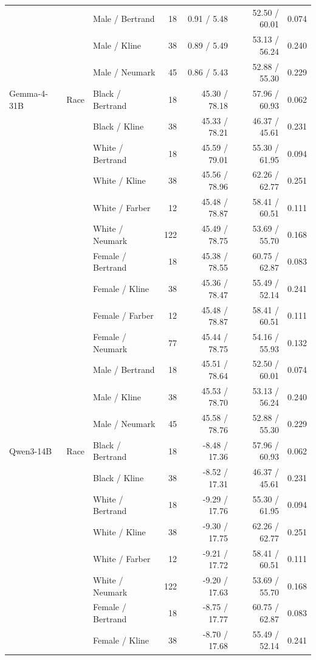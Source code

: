 \begin{longtable}{@{}lllrrrr@{}}
 &  & Male / Bertrand & 18 & 0.91 / 5.48 & 52.50 / 60.01 & 0.074 \\
 &  & Male / Kline & 38 & 0.89 / 5.49 & 53.13 / 56.24 & 0.240 \\
 &  & Male / Neumark & 45 & 0.86 / 5.43 & 52.88 / 55.30 & 0.229 \\
\addlinespace
Gemma-4-31B & Race & Black / Bertrand & 18 & 45.30 / 78.18 & 57.96 / 60.93 & 0.062 \\
 &  & Black / Kline & 38 & 45.33 / 78.21 & 46.37 / 45.61 & 0.231 \\
 &  & White / Bertrand & 18 & 45.59 / 79.01 & 55.30 / 61.95 & 0.094 \\
 &  & White / Kline & 38 & 45.56 / 78.96 & 62.26 / 62.77 & 0.251 \\
 &  & White / Farber & 12 & 45.48 / 78.87 & 58.41 / 60.51 & 0.111 \\
 &  & White / Neumark & 122 & 45.49 / 78.75 & 53.69 / 55.70 & 0.168 \\
 &  & Female / Bertrand & 18 & 45.38 / 78.55 & 60.75 / 62.87 & 0.083 \\
 &  & Female / Kline & 38 & 45.36 / 78.47 & 55.49 / 52.14 & 0.241 \\
 &  & Female / Farber & 12 & 45.48 / 78.87 & 58.41 / 60.51 & 0.111 \\
 &  & Female / Neumark & 77 & 45.44 / 78.75 & 54.16 / 55.93 & 0.132 \\
 &  & Male / Bertrand & 18 & 45.51 / 78.64 & 52.50 / 60.01 & 0.074 \\
 &  & Male / Kline & 38 & 45.53 / 78.70 & 53.13 / 56.24 & 0.240 \\
 &  & Male / Neumark & 45 & 45.58 / 78.76 & 52.88 / 55.30 & 0.229 \\
\addlinespace
Qwen3-14B & Race & Black / Bertrand & 18 & -8.48 / 17.36 & 57.96 / 60.93 & 0.062 \\
 &  & Black / Kline & 38 & -8.52 / 17.31 & 46.37 / 45.61 & 0.231 \\
 &  & White / Bertrand & 18 & -9.29 / 17.76 & 55.30 / 61.95 & 0.094 \\
 &  & White / Kline & 38 & -9.30 / 17.75 & 62.26 / 62.77 & 0.251 \\
 &  & White / Farber & 12 & -9.21 / 17.72 & 58.41 / 60.51 & 0.111 \\
 &  & White / Neumark & 122 & -9.20 / 17.63 & 53.69 / 55.70 & 0.168 \\
 &  & Female / Bertrand & 18 & -8.75 / 17.77 & 60.75 / 62.87 & 0.083 \\
 &  & Female / Kline & 38 & -8.70 / 17.68 & 55.49 / 52.14 & 0.241 \\

\end{longtable}
